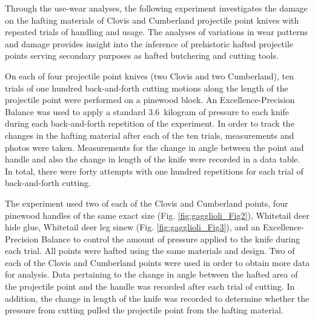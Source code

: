 


Through the use-wear analyses, the following experiment investigates the damage on the hafting materials of Clovis and Cumberland projectile point knives with repeated trials of handling and usage. The analyses of variations in wear patterns and damage provides insight into the inference of prehistoric hafted projectile points serving secondary purposes as hafted butchering and cutting tools. 

On each of four projectile point knives (two Clovis and two Cumberland), ten trials of one hundred back-and-forth cutting motions along the length of the projectile point were performed on a pinewood block. An Excellence-Precision Balance was used to apply a standard \SI{3.6}{kilogram} of pressure to each knife during each back-and-forth repetition of the experiment. In order to track the changes in the hafting material after each of the ten trials, measurements and photos were taken. Measurements for the change in angle between the point and handle and also the change in length of the knife were recorded in a data table. In total, there were forty attempts with one hundred repetitions for each trial of back-and-forth cutting. 

The  experiment used two of each of the Clovis and Cumberland points, four pinewood handles of the same exact size (Fig. \ref{fig:gagglioli_Fig2}), Whitetail deer hide glue, Whitetail deer leg sinew (Fig. \ref{fig:gagglioli_Fig3}), and an Excellence-Precision Balance to control the amount of pressure applied to the knife during each trial. All points were hafted using the same materials and design. Two of each of the Clovis and Cumberland points were used in order to obtain more data for analysis. Data pertaining to the change in angle between the hafted area of the projectile point and the handle was recorded after each trial of cutting. In addition, the change in length of the knife was recorded to determine whether the pressure from cutting pulled the projectile point from the hafting material.



